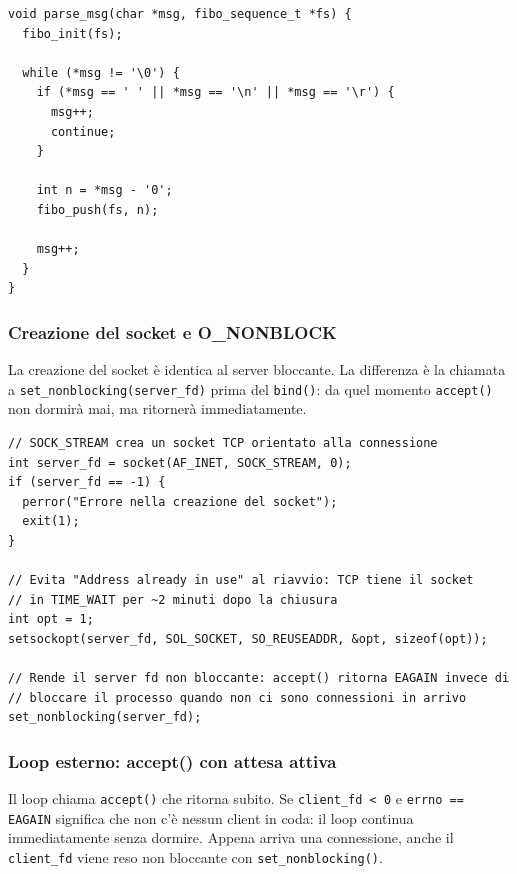 \documentclass[a4paper,12pt]{article}
\begin{document}
\begin{lstlisting}[caption={server\_tcp\_nonblock.c - parse\_msg()}]
void parse_msg(char *msg, fibo_sequence_t *fs) {
  fibo_init(fs);

  while (*msg != '\0') {
    if (*msg == ' ' || *msg == '\n' || *msg == '\r') {
      msg++;
      continue;
    }

    int n = *msg - '0';
    fibo_push(fs, n);

    msg++;
  }
}
\end{lstlisting}
\FloatBarrier

\subsubsection{Creazione del socket e O\_NONBLOCK}
La creazione del socket è identica al server bloccante. La differenza è la
chiamata a \texttt{set\_nonblocking(server\_fd)} prima del \texttt{bind()}: da
quel momento \texttt{accept()} non dormirà mai, ma ritornerà immediatamente.

\begin{lstlisting}[caption={server\_tcp\_nonblock.c - socket() e O\_NONBLOCK}]
// SOCK_STREAM crea un socket TCP orientato alla connessione
int server_fd = socket(AF_INET, SOCK_STREAM, 0);
if (server_fd == -1) {
  perror("Errore nella creazione del socket");
  exit(1);
}

// Evita "Address already in use" al riavvio: TCP tiene il socket
// in TIME_WAIT per ~2 minuti dopo la chiusura
int opt = 1;
setsockopt(server_fd, SOL_SOCKET, SO_REUSEADDR, &opt, sizeof(opt));

// Rende il server fd non bloccante: accept() ritorna EAGAIN invece di
// bloccare il processo quando non ci sono connessioni in arrivo
set_nonblocking(server_fd);
\end{lstlisting}
\FloatBarrier

\subsubsection{Loop esterno: accept() con attesa attiva}
Il loop chiama \texttt{accept()} che ritorna subito. Se \texttt{client\_fd < 0}
e \texttt{errno == EAGAIN} significa che non c'è nessun client in coda: il
loop continua immediatamente senza dormire. Appena arriva una connessione,
anche il \texttt{client\_fd} viene reso non bloccante con
\texttt{set\_nonblocking()}.
\end{document}
